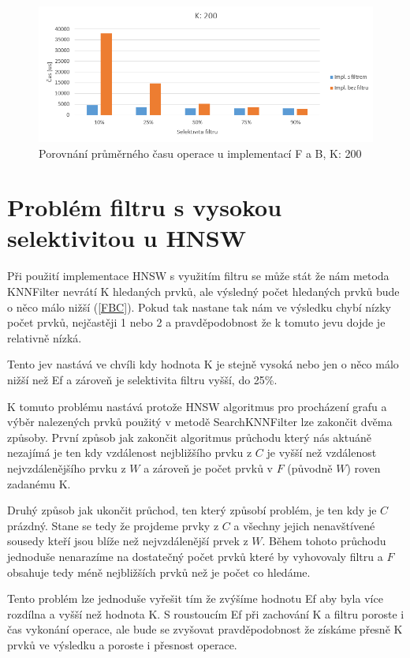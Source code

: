 \documentclass[czech,semestral,dept460,male,csharp,cpdeclaration]{diploma}
\begin{document}
		\begin{figure}
			\centering
			\includegraphics[scale=0.8]{Figures/graf_filtr_k200.png}
			\caption{Porovnání průměrného času operace u implementací F a B, K: 200}
			\label{graf_filtr_k200}
		\end{figure}
		
		\section{Problém filtru s vysokou selektivitou u HNSW}
		\label{FP}
		
			Při použití implementace HNSW s využitím filtru se může stát že nám metoda KNNFilter nevrátí K hledaných prvků, ale výsledný počet hledaných prvků bude o něco málo nižší (\ref{FBC}). Pokud tak nastane tak nám ve výsledku chybí nízky počet prvků, nejčastěji 1 nebo 2 a pravděpodobnost že k tomuto jevu dojde je relativně nízká.
			
			Tento jev nastává ve chvíli kdy hodnota K je stejně vysoká nebo jen o něco málo nižší než Ef a zároveň je selektivita filtru vyšší, do 25\%.
			
			K tomuto problému nastává protože HNSW algoritmus pro procházení grafu a výběr nalezených prvků použitý v metodě SearchKNNFilter lze zakončit dvěma způsoby. První způsob jak zakončit algoritmus průchodu který nás aktuáně nezajímá je ten kdy vzdálenost nejbližšího prvku z $C$ je vyšší než vzdálenost nejvzdálenějšího prvku z $W$ a zároveň je počet prvků v $F$ (původně $W$) roven zadanému K.
			
			Druhý způsob jak ukončit průchod, ten který způsobí problém, je ten kdy je $C$ prázdný. Stane se tedy že projdeme prvky z $C$ a všechny jejich nenavštívené sousedy kteří jsou blíže než nejvzdálenější prvek z $W$. Během tohoto průchodu jednoduše nenarazíme na dostatečný počet prvků které by vyhovovaly filtru a $F$ obsahuje tedy méně nejbližších prvků než je počet co hledáme.
			
			Tento problém lze jednoduše vyřešit tím že zvýšíme hodnotu Ef aby byla více rozdílna a vyšší než hodnota K. S roustoucím Ef při zachování K a filtru poroste i čas vykonání operace, ale bude se zvyšovat pravděpodobnost že získáme přesně K prvků ve výsledku a poroste i přesnost operace.
	
\end{document}
